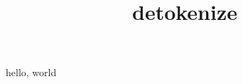 \documentclass{amsart}
\title{detokenize}
\begin{document}
\maketitle

hello, world

\texttt{}

\texttt{\detokenize{\fafkl {} $_&^}}

\edef\X{\detokenize{\fafkl {} $_&^}}

\meaning\X
\end{document}
